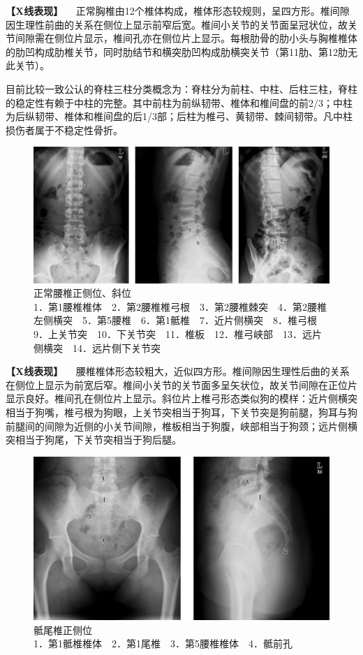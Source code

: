 \textbf{【X线表现】}
　正常胸椎由12个椎体构成，椎体形态较规则，呈四方形。椎间隙因生理性前曲的关系在侧位上显示前窄后宽。椎间小关节的关节面呈冠状位，故关节间隙需在侧位片显示，椎间孔亦在侧位片上显示。每根肋骨的肋小头与胸椎椎体的肋凹构成肋椎关节，同时肋结节和横突肋凹构成肋横突关节（第11肋、第12肋无此关节）。

目前比较一致公认的脊柱三柱分类概念为：脊柱分为前柱、中柱、后柱三柱，脊柱的稳定性有赖于中柱的完整。其中前柱为前纵韧带、椎体和椎间盘的前2/3；中柱为后纵韧带、椎体和椎间盘的后1/3部；后柱为椎弓、黄韧带、棘间韧带。凡中柱损伤者属于不稳定性骨折。

\begin{figure}[!htbp]
 \centering
 \includegraphics{./images/Image00013.jpg}
 \captionsetup{justification=centering}
 \caption{正常腰椎正侧位、斜位\\{\small 1．第1腰椎椎体　2．第2腰椎椎弓根　3．第2腰椎棘突　4．第2腰椎左侧横突　5．第5腰椎　6．第1骶椎　7．近片侧横突　8．椎弓根　9．上关节突　10．下关节突　11．椎板　12．椎弓峡部　13．远片侧横突　14．远片侧下关节突}}
 \label{fig2-1-11}
  \end{figure} 

\textbf{【X线表现】}
　腰椎椎体形态较粗大，近似四方形。椎间隙因生理性后曲的关系在侧位上显示为前宽后窄。椎间小关节的关节面多呈矢状位，故关节间隙在正位片显示良好。椎间孔在侧位片上显示。斜位片上椎弓形态类似狗的模样：近片侧横突相当于狗嘴，椎弓根为狗眼，上关节突相当于狗耳，下关节突是狗前腿，狗耳与狗前腿间的间隙为近侧的小关节间隙，椎板相当于狗腹，峡部相当于狗颈；远片侧横突相当于狗尾，下关节突相当于狗后腿。

\begin{figure}[!htbp]
 \centering
 \includegraphics{./images/Image00014.jpg}
 \captionsetup{justification=centering}
 \caption{骶尾椎正侧位\\{\small 1．第1骶椎椎体　2．第1尾椎　3．第5腰椎椎体　4．骶前孔}}
 \label{fig2-1-12}
  \end{figure} 

